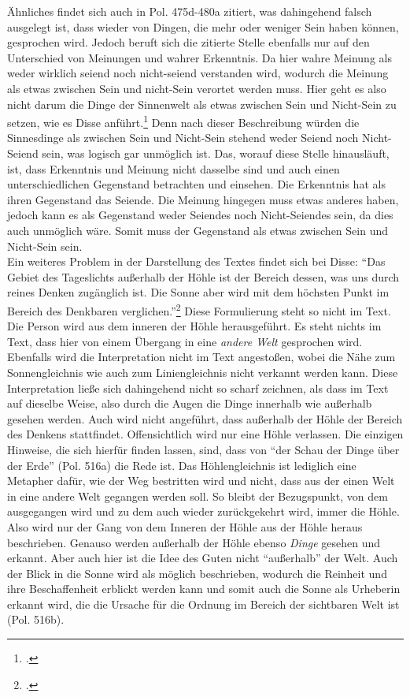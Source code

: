 Ähnliches findet sich auch in Pol. 475d-480a zitiert, was dahingehend falsch ausgelegt ist, dass wieder von Dingen, die mehr oder weniger Sein haben können, gesprochen wird. Jedoch beruft sich die zitierte Stelle ebenfalls nur auf den Unterschied von Meinungen und wahrer Erkenntnis. Da hier wahre Meinung als weder wirklich seiend noch nicht-seiend verstanden wird, wodurch die Meinung als etwas zwischen Sein und nicht-Sein verortet werden muss. Hier geht es also nicht darum die Dinge der Sinnenwelt als etwas zwischen Sein und Nicht-Sein zu setzen, wie es Disse anführt.\footcite[vgl.][S. 38]{DisseMetaphysik} 
Denn nach dieser Beschreibung würden die Sinnesdinge als zwischen Sein und Nicht-Sein stehend weder Seiend noch Nicht-Seiend sein, was logisch gar unmöglich ist.   
Das, worauf diese Stelle hinausläuft, ist, dass Erkenntnis und Meinung nicht dasselbe sind und auch einen unterschiedlichen Gegenstand betrachten und einsehen. Die Erkenntnis hat als ihren Gegenstand das Seiende. Die Meinung hingegen muss etwas anderes haben, jedoch kann es als Gegenstand weder Seiendes noch Nicht-Seiendes sein, da dies auch unmöglich wäre. Somit muss der Gegenstand als etwas zwischen Sein und Nicht-Sein sein.\\
Ein weiteres Problem in der Darstellung des Textes findet sich bei Disse:
\enquote{Das Gebiet des Tageslichts außerhalb der Höhle ist der Bereich dessen, was uns durch reines Denken zugänglich ist. Die Sonne aber wird mit dem höchsten Punkt im Bereich des Denkbaren verglichen.}\footcite[][S. 49]{DisseMetaphysik} Diese Formulierung steht so nicht im Text. Die Person wird aus dem inneren der Höhle herausgeführt. Es steht nichts im Text, dass hier von einem Übergang in eine \emph{andere Welt} gesprochen wird. Ebenfalls wird die Interpretation nicht im Text angestoßen, wobei die Nähe zum Sonnengleichnis wie auch zum Liniengleichnis nicht verkannt werden kann. Diese Interpretation ließe sich dahingehend nicht so scharf zeichnen, als dass im Text auf dieselbe Weise, also durch die Augen die Dinge innerhalb wie außerhalb gesehen werden. Auch wird nicht angeführt, dass außerhalb der Höhle der Bereich des Denkens stattfindet. Offensichtlich wird nur eine Höhle verlassen. Die einzigen Hinweise, die sich hierfür finden lassen, sind, dass von \enquote{der Schau der Dinge über der Erde} (Pol. 516a) die Rede ist. 
Das Höhlengleichnis ist lediglich eine Metapher dafür, wie der Weg bestritten wird und nicht, dass aus der einen Welt in eine andere Welt gegangen werden soll. So bleibt der Bezugspunkt, von dem ausgegangen wird und zu dem auch wieder zurückgekehrt wird, immer die Höhle. Also wird nur der Gang von dem Inneren der Höhle aus der Höhle heraus beschrieben. Genauso werden außerhalb der Höhle ebenso \emph{Dinge} gesehen und erkannt. Aber auch hier ist die Idee des Guten nicht \enquote{außerhalb} der Welt. Auch der Blick in die Sonne wird als möglich beschrieben, wodurch die Reinheit und ihre Beschaffenheit erblickt werden kann und somit auch die Sonne als Urheberin erkannt wird, die die Ursache für die Ordnung im Bereich der sichtbaren Welt ist (Pol. 516b).
